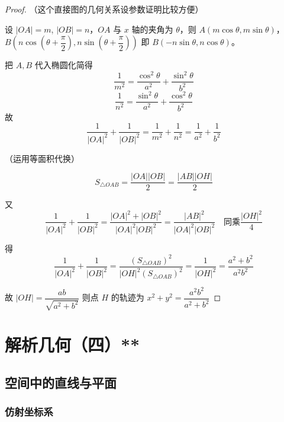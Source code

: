 \begin{proof}

（这个直接图的几何关系设参数证明比较方便）

设 $|OA| = m$, $|OB| = n$，$OA$ 与 $x$ 轴的夹角为 $\theta$，则 $A(m\cos\theta, m\sin\theta)$，$B\left(n\cos\left(\theta + \dfrac{\pi}{2}\right), n\sin\left(\theta + \dfrac{\pi}{2}\right)\right)$ 即 $B(-n\sin\theta, n\cos\theta)$。

把 $A, B$ 代入椭圆化简得
\[
\dfrac{1}{m^2} = \dfrac{\cos^2\theta}{a^2} + \dfrac{\sin^2\theta}{b^2}
\]
\[
\dfrac{1}{n^2} = \dfrac{\sin^2\theta}{a^2} + \dfrac{\cos^2\theta}{b^2}
\]
故
\[
\dfrac{1}{|OA|^2} + \dfrac{1}{|OB|^2} = \dfrac{1}{m^2} + \dfrac{1}{n^2} = \dfrac{1}{a^2} + \dfrac{1}{b^2}
\]

（运用等面积代换）

\[
S_{\triangle OAB} = \dfrac{|OA||OB|}{2} = \dfrac{|AB||OH|}{2}
\]

又
\[
\dfrac{1}{|OA|^2} + \dfrac{1}{|OB|^2} = \dfrac{|OA|^2 + |OB|^2}{|OA|^2|OB|^2} = \dfrac{|AB|^2}{|OA|^2|OB|^2} \quad \text{同乘} \dfrac{|OH|^2}{4}
\]

得
\[
\dfrac{1}{|OA|^2} + \dfrac{1}{|OB|^2} = \dfrac{(S_{\triangle OAB})^2}{|OH|^2 (S_{\triangle OAB})^2} = \dfrac{1}{|OH|^2} = \dfrac{a^2 + b^2}{a^2 b^2}
\]

故 $|OH| = \dfrac{ab}{\sqrt{a^2 + b^2}}$ 则点 $H$ 的轨迹为 $x^2 + y^2 = \dfrac{a^2 b^2}{a^2 + b^2}$


\end{proof}




\clearpage


\review

\clearpage

\hw
\begin{homework}
    
\end{homework}
\clearpage





\chapter{解析几何（四）**}
\section{空间中的直线与平面}
\subsection{仿射坐标系}
\clearpage

